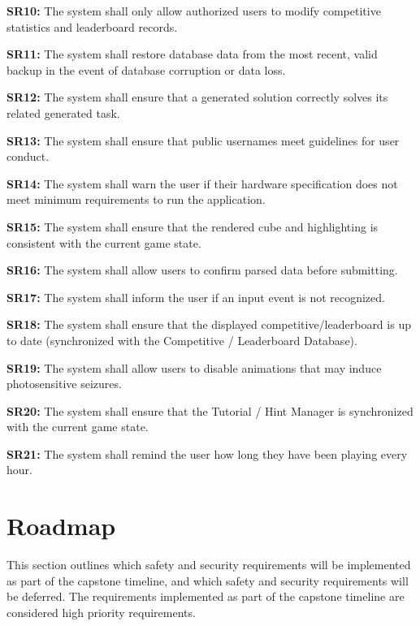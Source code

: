 \documentclass{article}
\begin{document}
\noindent\textbf{SR10\label{req:SR10}:} The system shall only allow authorized users to modify competitive statistics and leaderboard records.

\noindent\textbf{SR11\label{req:SR11}:} The system shall restore database data from the most recent, valid backup in the event of database corruption or data loss.

\noindent\textbf{SR12\label{req:SR12}:} The system shall ensure that a generated solution correctly solves its related generated task.

\noindent\textbf{SR13\label{req:SR13}:} The system shall ensure that public usernames meet guidelines for user conduct.

\noindent\textbf{SR14\label{req:SR14}:} The system shall warn the user if their hardware specification does not meet minimum requirements to run the application.

\noindent\textbf{SR15\label{req:SR15}:} The system shall ensure that the rendered cube and highlighting is consistent with the current game state.

\noindent\textbf{SR16\label{req:SR16}:} The system shall allow users to confirm parsed data before submitting.

\noindent\textbf{SR17\label{req:SR17}:} The system shall inform the user if an input event is not recognized.

\noindent\textbf{SR18\label{req:SR18}:} The system shall ensure that the displayed competitive/leaderboard is up to date (synchronized with the Competitive / Leaderboard Database).

\noindent\textbf{SR19\label{req:SR19}:} The system shall allow users to disable animations that may induce photosensitive seizures.

\noindent\textbf{SR20\label{req:SR20}:} The system shall ensure that the Tutorial / Hint Manager is synchronized with the current game state.

\noindent\textbf{SR21\label{req:SR21}:} The system shall remind the user how long they have been playing every hour.

\section{Roadmap}

This section outlines which safety and security requirements will be implemented as part of the capstone timeline, and which safety and security requirements will be deferred. The requirements implemented as part of the capstone timeline are considered high priority requirements.
\end{document}
